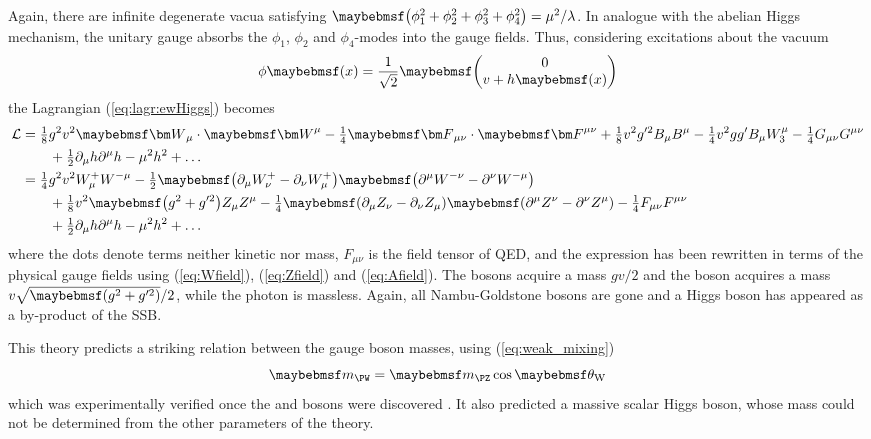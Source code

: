 Again, there are infinite degenerate vacua satisfying 
$\parenths{\phi_1^2 + \phi_2^2 + \phi_3^2 + \phi_4^2} = \mu^2/\lambda$. In analogue with 
the abelian Higgs mechanism, the unitary gauge absorbs the $\phi_1$, $\phi_2$ and 
$\phi_4$-modes into the gauge fields. Thus, considering excitations about the vacuum
\begin{equation}
	\phi\parenths{x} = \frac{1}{\sqrt{2}} \colvector{0\\  
	v + h\parenths{x}} \label{eq:higgs_doublet}
\end{equation}
the Lagrangian (\ref{eq:lagr:ewHiggs}) becomes
\begin{align}
	\mathcal{L} &= \tfrac{1}{8} g^2 v^2 \bvec{W}_{\mu} \cdot \bvec{W}^{\mu} - \tfrac{1}{4} \bvec{F}_{\mu\nu} \cdot \bvec{F}^{\mu\nu} + \tfrac{1}{8} v^2 g'^2 B_{\mu} B^{\mu} - \tfrac{1}{4} v^2 gg' B_{\mu} W_{3}^{\mu} - \tfrac{1}{4} G_{\mu\nu} G^{\mu\nu} \nonumber \\
	&\quad\quad {} + \tfrac{1}{2} \partial_{\mu}h \partial^{\mu}h - \mu^2 h^2 + \dots \\
	&= \tfrac{1}{4} g^2 v^2 W^{+}_{\mu} W^{-\mu} - \tfrac{1}{2} \parenths{\partial_{\mu}W^{+}_{\nu} - \partial_{\nu}W^{+}_{\mu}} \parenths{\partial^{\mu}W^{-\nu} - \partial^{\nu}W^{-\mu}} \nonumber \\
	&\quad\quad {} + \tfrac{1}{8} v^2 \parenths{g^2 + g'^2} Z_{\mu} Z^{\mu} - \tfrac{1}{4} \parenths{\partial_{\mu}Z_{\nu} - \partial_{\nu}Z_{\mu}} \parenths{\partial^{\mu}Z^{\nu} - \partial^{\nu}Z^{\mu}} - \tfrac{1}{4} F_{\mu\nu} F^{\mu\nu} \nonumber \\
	&\quad\quad {} + \tfrac{1}{2} \partial_{\mu}h \partial^{\mu}h - \mu^2 h^2 + \dots
\end{align}
where the dots denote terms neither kinetic nor mass, $F_{\mu\nu}$ is the field tensor of
QED, and the expression has been rewritten in terms of the physical gauge fields 
using (\ref{eq:Wfield}), (\ref{eq:Zfield}) and (\ref{eq:Afield}). The \PWpm bosons 
acquire a mass $gv/2$ and the \PZ boson acquires a mass $v \sqrt{\parenths{g^2+g'^2}}/2$, 
while the photon is massless. Again, all Nambu-Goldstone bosons are gone and a Higgs 
boson has appeared as a by-product of the SSB.

This theory predicts a striking relation between the gauge boson masses, using 
(\ref{eq:weak_mixing})
\begin{equation}
	\mW = \mZ \cos\thetaW
\end{equation}
which was experimentally verified once the \PW and \PZ bosons were discovered 
\cite{UA1:Wboson,UA2:Wboson,UA1:Zboson,UA2:Zboson,UA1:1989}. It also predicted a massive 
scalar Higgs boson, whose mass could not be determined from the other parameters of the 
theory.

